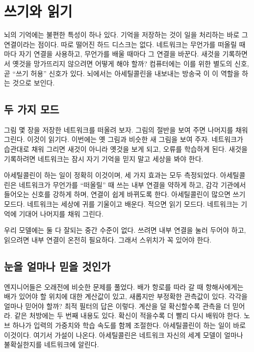 \chapter{쓰기와 읽기}

뇌의 기억에는 불편한 특성이 하나 있다. 기억을 저장하는 것이 일을 처리하는 바로 그 연결이라는 점이다. 따로 떨어진 하드 디스크는 없다. 네트워크는 무언가를 떠올릴 때마다 자기 연결을 사용하고, 무언가를 배울 때마다 그 연결을 바꾼다. 새것을 기록하면서 옛것을 망가뜨리지 않으려면 어떻게 해야 할까? 컴퓨터에는 이를 위한 별도의 신호, 곧 “쓰기 허용” 신호가 있다. 뇌에서는 아세틸콜린을 내보내는 방송국 이 이 역할을 하는 것으로 보인다.

\section*{두 가지 모드}

그림 몇 장을 저장한 네트워크를 떠올려 보자. 그림의 절반을 보여 주면 나머지를 채워 그린다. 이것이 읽기다. 이번에는 옛 그림과 비슷한 새 그림을 보여 주자. 네트워크가 습관대로 채워 그리면 새것이 아니라 옛것을 보게 되고, 오류를 학습하게 된다. 새것을 기록하려면 네트워크는 잠시 자기 기억을 믿지 말고 세상을 봐야 한다.


아세틸콜린이 하는 일이 정확히 이것이며, 세 가지 효과는 모두 측정되었다. 아세틸콜린은 네트워크가 무언가를 “떠올릴” 때 쓰는 내부 연결을 약하게 하고, 감각 기관에서 들어오는 신호를 강하게 하며, 연결이 쉽게 바뀌도록 한다. 아세틸콜린이 많으면 쓰기 모드다. 네트워크는 세상에 귀를 기울이고 배운다. 적으면 읽기 모드다. 네트워크는 기억에 기대어 나머지를 채워 그린다.

우리 모델에는 둘 다 잘되는 중간 수준이 없다. 쓰려면 내부 연결을 눌러 두어야 하고, 읽으려면 내부 연결이 온전히 필요하다. 그래서 스위치가 꼭 있어야 한다.

\section*{눈을 얼마나 믿을 것인가}

엔지니어들은 오래전에 비슷한 문제를 풀었다. 배가 항로를 따라 갈 때 항해사에게는 배가 있어야 할 위치에 대한 계산값이 있고, 새롭지만 부정확한 관측값이 있다. 각각을 얼마나 믿어야 할까? 최적 필터의 답은 이렇다. 계산을 덜 확신할수록 관측을 더 믿어라. 같은 처방에는 두 번째 내용도 있다. 확신이 적을수록 더 빨리 다시 배워야 한다. 노브 하나가 입력의 가중치와 학습 속도를 함께 조절한다. 아세틸콜린이 하는 일이 바로 이것이다. 여기서 가설이 나온다. 아세틸콜린은 네트워크 자신의 세계 모델이 얼마나 불확실한지를 네트워크에 알린다.

